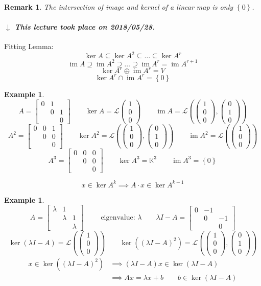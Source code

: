 \documentclass[a4paper]{article}
\newcounter{lecref}[section]
\numberwithin{lecref}{section}
\newtheorem{example}[lecref]{Example}
\newtheorem*{Example}{Example}
\newtheorem*{Remark}{Remark}
\newcommand{\set}[1]{\left\{#1\right\}}
\newcommand{\dateref}[1]{%
  \begin{mdframed}[backgroundcolor=gray!10,innerbottommargin=0pt,innertopmargin=0pt]
    \paragraph{\textit{$\downarrow$ This lecture took place on #1.}}%
  \end{mdframed}%
}
\newcommand{\vecthree}[3]{\begin{pmatrix} #1 \\ #2 \\ #3 \end{pmatrix}}
\DeclareMathOperator{\im}{im}
\begin{document}
\begin{Remark}
  The intersection of image and kernel of a linear map is only $\set{0}$.
\end{Remark}

\dateref{2018/05/28}

Fitting Lemma:
\[ \ker{A} \subseteq \ker{A^2} \subseteq \dots \subseteq \ker{A^r} \]
\[ \im{A} \supseteq \im{A^2} \supseteq \dots \supseteq \im{A^r} = \im{A^{r+1}} \]
\[ \ker{A^r} \oplus \im{A^r} = V \]
\[ \ker{A^r} \cap \im{A^r} = \set{0} \]

\begin{example} %
  \[ A = \begin{bmatrix} 0 & 1 & \\ & 0 & 1 \\ & &  0 \end{bmatrix}
     \qquad \ker{A} = \mathcal L\vecthree 100
     \qquad \im{A} = \mathcal L\left(\vecthree 100, \vecthree 010\right) \]
  \[ A^2 = \begin{bmatrix} 0 & 0 & 1 \\ & 0 & 0 \\ & &  0 \end{bmatrix}
     \qquad \ker{A^2} = \mathcal L\left(\vecthree 100, \vecthree 010\right)
     \qquad \im{A^2} = \mathcal L\left(\vecthree 100\right) \]
  \[ A^3 = \begin{bmatrix} 0 & 0 & 0 \\ & 0 & 0 \\ & &  0 \end{bmatrix}
     \qquad \ker{A^3} = \mathbb K^3
     \qquad \im{A^3} = \set{0} \]

  \begin{mdframed}
    \[ x \in \ker{A^k} \implies A \cdot x \in \ker{A^{k-1}} \]
  \end{mdframed}
\end{example}

\begin{Example}
  \[
    A = \begin{bmatrix} \lambda & 1 &  \\ & \lambda & 1 \\ & & \lambda \end{bmatrix}
    \qquad \text{ eigenvalue: } \lambda
    \qquad \lambda I - A = \begin{bmatrix} 0 & -1 & \\ & 0 & -1 \\ & & 0 \end{bmatrix}
  \]
  \[
    \ker(\lambda I - A) = \mathcal L\left(\vecthree 100\right)
    \qquad \ker((\lambda I - A)^2) = \mathcal L\left(\vecthree 100, \vecthree 010\right)
  \]
  \begin{align*}
    x \in \ker((\lambda I - A)^2)
      &\implies (\lambda I - A) x \in \ker(\lambda I - A) \\
      &\implies Ax = \lambda x + b \qquad b \in \ker(\lambda I - A)
  \end{align*}
\end{Example}
\end{document}
